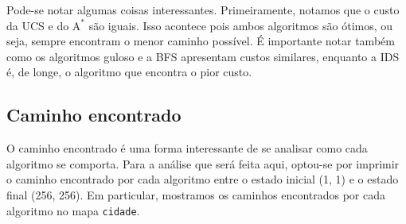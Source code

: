 \documentclass{article}
\begin{document}
Pode-se notar algumas coisas interessantes. Primeiramente, notamos que o custo da UCS e do \(\text{A}^*\) são iguais. Isso acontece pois ambos algoritmos são ótimos, ou seja, sempre encontram o menor caminho possível.
É importante notar também como os algoritmos guloso e a BFS apresentam custos similares, enquanto a IDS é, de longe, o algoritmo que encontra o pior custo.

\subsection{Caminho encontrado}

O caminho encontrado é uma forma interessante de se analisar como cada algoritmo se comporta. Para a análise que será feita aqui, optou-se por imprimir o caminho encontrado por cada algoritmo entre o estado inicial
(1, 1) e o estado final (256, 256). Em particular, mostramos os caminhos encontrados por cada algoritmo no mapa \texttt{cidade}.

\begin{figure}[H]
	\centering
\end{figure}
\end{document}
